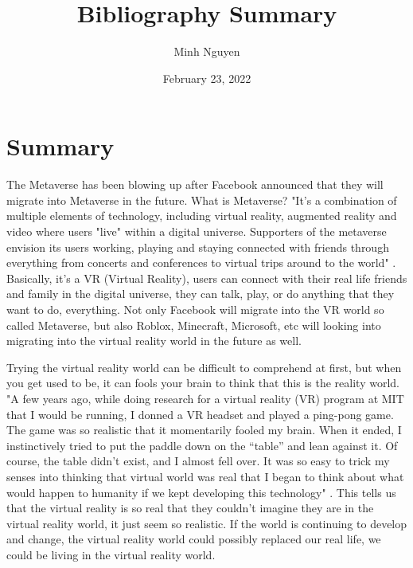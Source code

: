 \documentclass{article}
\title{Bibliography Summary}
\author{Minh Nguyen}
\date{February 23, 2022}
\begin{document}
\maketitle

\section*{Summary}
The Metaverse has been blowing up after Facebook announced that they will migrate into Metaverse in the future. What is Metaverse? "It's a combination of multiple elements of technology, including virtual reality, augmented reality and video where users "live" within a digital universe. Supporters of the metaverse envision its users working, playing and staying connected with friends through everything from concerts and conferences to virtual trips around to the world" \cite{mike2022}. Basically, it's a VR (Virtual Reality), users can connect with their real life friends and family in the digital universe, they can talk, play, or do anything that they want to do, everything. Not only Facebook will migrate into the VR world so called Metaverse, but also Roblox, Minecraft, Microsoft, etc will looking into migrating into the virtual reality world in the future as well.

\medskip

Trying the virtual reality world can be difficult to comprehend at first, but when you get used to be, it can fools your brain to think that this is the reality world. "A few years ago, while doing research for a virtual reality (VR) program at MIT that I would be running, I donned a VR headset and played a ping-pong game. The game was so realistic that it momentarily fooled my brain. When it ended, I instinctively tried to put the paddle down on the “table” and lean against it.  Of course, the table didn’t exist, and I almost fell over. It was so easy to trick my senses into thinking that virtual world was real that I began to think about what would happen to humanity if we kept developing this technology" \cite{rizwan2022}. This tells us that the virtual reality is so real that they couldn't imagine they are in the virtual reality world, it just seem so realistic. If the world is continuing to develop and change, the virtual reality world could possibly replaced our real life, we could be living in the virtual reality world.

\printbibliography
\end{document}

